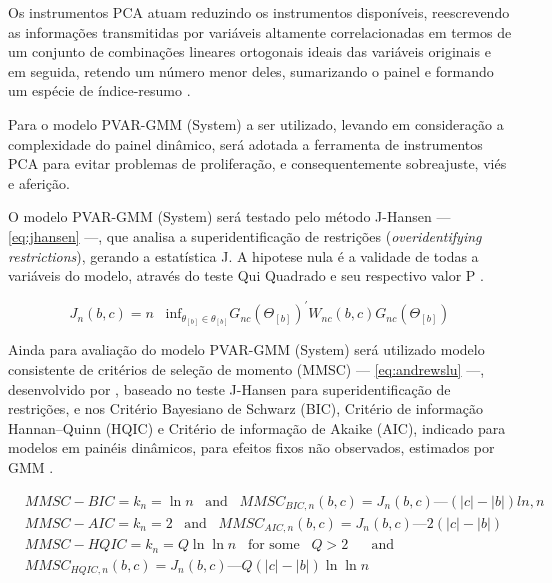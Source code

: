 \documentclass[
  12pt,
  12pt,
  openright,
  oneside,
  a4paper,
  chapter=TITLE,
  section=TITLE,
  subsection=TITLE,
  subsubsection=TITLE,
  english,
  portugues,
  sumario=tradicional]{abntex2}
\begin{document}
Os instrumentos PCA atuam reduzindo os instrumentos disponíveis, reescrevendo as informações transmitidas por variáveis altamente correlacionadas em termos de um conjunto de combinações lineares ortogonais ideais das variáveis originais e em seguida, retendo um número menor deles, sumarizando o painel e formando um espécie de índice-resumo \cite{bontempi:2015}.

Para o modelo PVAR-GMM (System) a ser utilizado, levando em consideração a complexidade do painel dinâmico, será adotada a ferramenta de instrumentos PCA para evitar problemas de proliferação, e consequentemente sobreajuste, viés e aferição.

O modelo PVAR-GMM (System) será testado pelo método J-Hansen --- \autoref{eq:jhansen} ---, que analisa a superidentificação de restrições (\emph{overidentifying restrictions}), gerando a estatística J. A hipotese nula é a validade de todas a variáveis do modelo, através do teste Qui Quadrado e seu respectivo valor P \cite{andrews-lu:2001,sigmund:2008}.

\begin{equation}\label{eq:jhansen}
J_{n}(b,c) = n \hspace{10pt} \text{inf}_{\theta_{[b]} \in \theta_{[b]}} G_{nc} (\Theta_{[b]})^{'}W_{nc}(b,c)G_{nc}(\Theta_{[b]}) 
\end{equation}

Ainda para avaliação do modelo PVAR-GMM (System) será utilizado modelo consistente de critérios de seleção de momento (MMSC) --- \autoref{eq:andrewslu} ---, desenvolvido por \textcite{andrews-lu:2001}, baseado no teste J-Hansen para superidentificação de restrições, e nos Critério Bayesiano de Schwarz (BIC), Critério de informação Hannan--Quinn (HQIC) e Critério de informação de Akaike (AIC), indicado para modelos em painéis dinâmicos, para efeitos fixos não observados, estimados por GMM \cite{sigmund:2008, zivotwang:2003}.

\begin{equation}\label{eq:andrewslu}
\begin{aligned}{}
& MMSC-BIC = k_{n} = \ln n \hspace{10pt} \text{and} \hspace{10pt} MMSC_{BIC,n}(b,c) = J_{n}(b,c) — (|c| - |b| )ln,n \\
& MMSC-AIC = k_{n} = 2 \hspace{10pt} \text{and} \hspace{10pt} 
MMSC_{AIC,n}(b,c) = J_{n}(b,c) — 2(|c| - |b| ) \\
& MMSC-HQIC = k_{n} = Q \ln \ln n  \hspace{10pt} \text{for some} \hspace{10pt} Q > 2 \hspace{10pt} \hspace{10pt} \text{and} \hspace{10pt}  \\
& MMSC_{HQIC,n}(b,c) = J_{n}(b,c) — Q(|c| - |b|)\ln\ln n
\end{aligned}
\end{equation}
\end{document}
